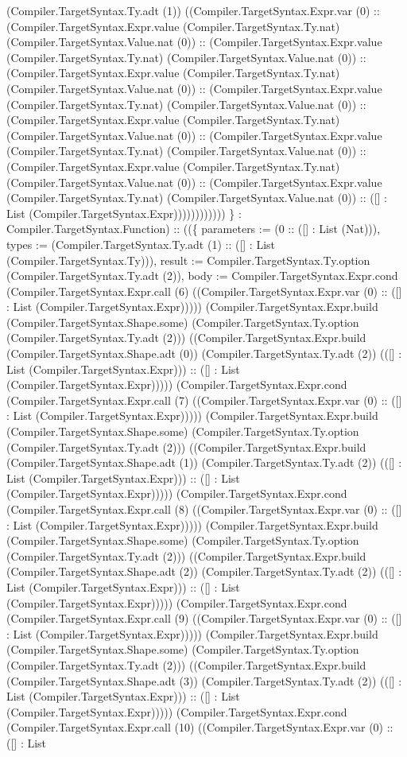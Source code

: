 \documentclass[11pt]{article}
\begin{document}
(Compiler.TargetSyntax.Ty.adt (1)) ((Compiler.TargetSyntax.Expr.var (0) :: (Compiler.TargetSyntax.Expr.value (Compiler.TargetSyntax.Ty.nat) (Compiler.TargetSyntax.Value.nat (0)) :: (Compiler.TargetSyntax.Expr.value (Compiler.TargetSyntax.Ty.nat) (Compiler.TargetSyntax.Value.nat (0)) :: (Compiler.TargetSyntax.Expr.value (Compiler.TargetSyntax.Ty.nat) (Compiler.TargetSyntax.Value.nat (0)) :: (Compiler.TargetSyntax.Expr.value (Compiler.TargetSyntax.Ty.nat) (Compiler.TargetSyntax.Value.nat (0)) :: (Compiler.TargetSyntax.Expr.value (Compiler.TargetSyntax.Ty.nat) (Compiler.TargetSyntax.Value.nat (0)) :: (Compiler.TargetSyntax.Expr.value (Compiler.TargetSyntax.Ty.nat) (Compiler.TargetSyntax.Value.nat (0)) :: (Compiler.TargetSyntax.Expr.value (Compiler.TargetSyntax.Ty.nat) (Compiler.TargetSyntax.Value.nat (0)) :: (Compiler.TargetSyntax.Expr.value (Compiler.TargetSyntax.Ty.nat) (Compiler.TargetSyntax.Value.nat (0)) :: ([] : List (Compiler.TargetSyntax.Expr)))))))))))) \} : Compiler.TargetSyntax.Function) :: ((\{ parameters := (0 :: ([] : List (Nat))), types := (Compiler.TargetSyntax.Ty.adt (1) :: ([] : List (Compiler.TargetSyntax.Ty))), result := Compiler.TargetSyntax.Ty.option (Compiler.TargetSyntax.Ty.adt (2)), body := Compiler.TargetSyntax.Expr.cond (Compiler.TargetSyntax.Expr.call (6) ((Compiler.TargetSyntax.Expr.var (0) :: ([] : List (Compiler.TargetSyntax.Expr))))) (Compiler.TargetSyntax.Expr.build (Compiler.TargetSyntax.Shape.some) (Compiler.TargetSyntax.Ty.option (Compiler.TargetSyntax.Ty.adt (2))) ((Compiler.TargetSyntax.Expr.build (Compiler.TargetSyntax.Shape.adt (0)) (Compiler.TargetSyntax.Ty.adt (2)) (([] : List (Compiler.TargetSyntax.Expr))) :: ([] : List (Compiler.TargetSyntax.Expr))))) (Compiler.TargetSyntax.Expr.cond (Compiler.TargetSyntax.Expr.call (7) ((Compiler.TargetSyntax.Expr.var (0) :: ([] : List (Compiler.TargetSyntax.Expr))))) (Compiler.TargetSyntax.Expr.build (Compiler.TargetSyntax.Shape.some) (Compiler.TargetSyntax.Ty.option (Compiler.TargetSyntax.Ty.adt (2))) ((Compiler.TargetSyntax.Expr.build (Compiler.TargetSyntax.Shape.adt (1)) (Compiler.TargetSyntax.Ty.adt (2)) (([] : List (Compiler.TargetSyntax.Expr))) :: ([] : List (Compiler.TargetSyntax.Expr))))) (Compiler.TargetSyntax.Expr.cond (Compiler.TargetSyntax.Expr.call (8) ((Compiler.TargetSyntax.Expr.var (0) :: ([] : List (Compiler.TargetSyntax.Expr))))) (Compiler.TargetSyntax.Expr.build (Compiler.TargetSyntax.Shape.some) (Compiler.TargetSyntax.Ty.option (Compiler.TargetSyntax.Ty.adt (2))) ((Compiler.TargetSyntax.Expr.build (Compiler.TargetSyntax.Shape.adt (2)) (Compiler.TargetSyntax.Ty.adt (2)) (([] : List (Compiler.TargetSyntax.Expr))) :: ([] : List (Compiler.TargetSyntax.Expr))))) (Compiler.TargetSyntax.Expr.cond (Compiler.TargetSyntax.Expr.call (9) ((Compiler.TargetSyntax.Expr.var (0) :: ([] : List (Compiler.TargetSyntax.Expr))))) (Compiler.TargetSyntax.Expr.build (Compiler.TargetSyntax.Shape.some) (Compiler.TargetSyntax.Ty.option (Compiler.TargetSyntax.Ty.adt (2))) ((Compiler.TargetSyntax.Expr.build (Compiler.TargetSyntax.Shape.adt (3)) (Compiler.TargetSyntax.Ty.adt (2)) (([] : List (Compiler.TargetSyntax.Expr))) :: ([] : List (Compiler.TargetSyntax.Expr))))) (Compiler.TargetSyntax.Expr.cond (Compiler.TargetSyntax.Expr.call (10) ((Compiler.TargetSyntax.Expr.var (0) :: ([] : List 
\end{document}
